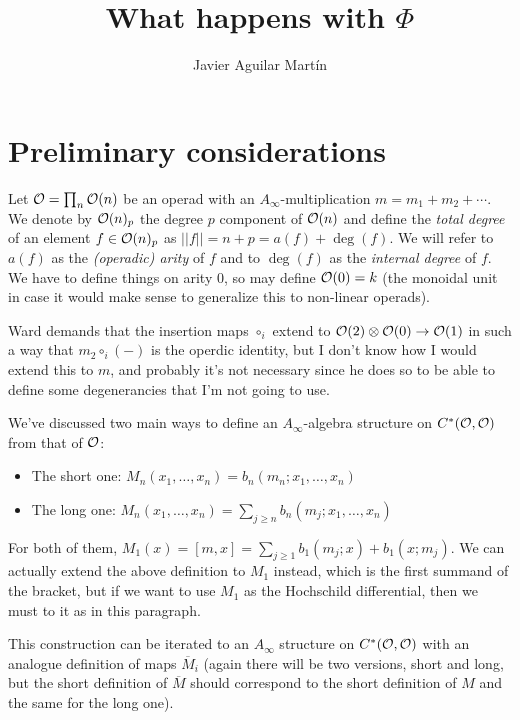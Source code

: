 \documentclass[twoside]{article}
\begin{document}
\title{What happens with $\Phi$}
\author{Javier Aguilar Martín}
\maketitle

\section{Preliminary considerations}

Let $\mathcal{O}=\prod_n{\mathcal O}(n)$ be an operad with an $A_\infty$-multiplication $m=m_1+m_2+\cdots$. We denote by ${\mathcal O}(n)_p$ the degree $p$ component of ${\mathcal O}(n)$ and define the \emph{total degree} of an element $f\in {\mathcal O}(n)_p$ as $||f||=n+p=a(f)+\deg(f)$. We will refer to $a(f)$ as the \emph{(operadic) arity} of $f$ and to $\deg(f)$ as the \emph{internal degree} of $f$. We have to define things on arity 0, so may define ${\mathcal O}(0)=k$ (the monoidal unit in case it would make sense to generalize this to non-linear operads). 

\begin{nota}Ward demands that the insertion maps $\circ_i$ extend to ${\mathcal O}(2)\otimes{\mathcal O}(0)\to {\mathcal O}(1)$ in such a way that $m_2\circ_i(-)$ is the operdic identity, but I don't know how I would extend this to $m$, and probably it's not necessary since he does so to be able to define some degenerancies that I'm not going to use.
\end{nota}

We've discussed two main ways to define an $A_\infty$-algebra structure on $C^*({\mathcal O},{\mathcal O})$ from that of ${\mathcal O}$:
\begin{itemize}
\item The short one: $M_n(x_1,\dots, x_n)=b_n(m_n;x_1,\dots, x_n)$
\item The long one: $M_n(x_1,\dots, x_n)=\sum_{j\geq n}b_n(m_j;x_1,\dots, x_n)$
\end{itemize}

For both of them, $M_1(x)=[m,x]=\sum_{j\geq 1}b_1(m_j;x)+b_1(x;m_j)$. We can actually extend the above definition to $M_1$ instead, which is the first summand of the bracket, but if we want to use $M_1$ as the Hochschild differential, then we must to it as in this paragraph.

This construction can be iterated to an $A_\infty$ structure on $C^*({\mathcal O},{\mathcal O})$ with an analogue definition of maps $\overline{M}_i$ (again there will be two versions, short and long, but the short definition of $\overline{M}$ should correspond to the short definition of $M$ and the same for the long one).
\end{document}
